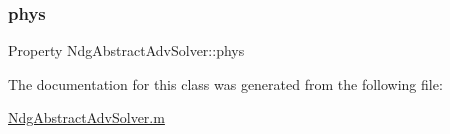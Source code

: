 \subsubsection{\texorpdfstring{phys}{phys}}
{\footnotesize\ttfamily Property Ndg\+Abstract\+Adv\+Solver\+::phys\hspace{0.3cm}{\ttfamily [protected]}}



The documentation for this class was generated from the following file\+:\begin{DoxyCompactItemize}
\item 
\hyperlink{_ndg_abstract_adv_solver_8m}{Ndg\+Abstract\+Adv\+Solver.\+m}\end{DoxyCompactItemize}
